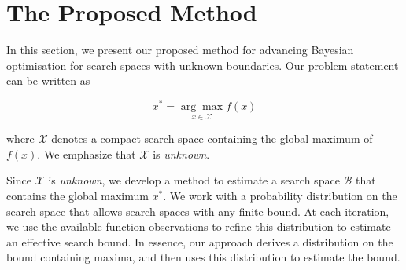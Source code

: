 \documentclass[preprint]{elsarticle}
\begin{document}
%

\section{The Proposed Method}\label{sec:Method}
In this section, we present our proposed method for advancing Bayesian optimisation for search spaces with unknown boundaries. Our problem statement can be written as 
\begin{linenomath*}
\begin{equation}
x^* = \underset{{x \in \mathcal{X}}}{\arg\max} f(x)
\end{equation}
\end{linenomath*}
where $\mathcal{X}$ denotes  a compact search space containing the global maximum of $f(x)$. We emphasize that $\mathcal{X}$ is \emph{unknown}.

Since $\mathcal{X}$ is \emph{unknown}, we develop a method to estimate a search space $\mathcal{B}$ that contains the global maximum $x^*$. We work with a probability distribution on the search space that allows search spaces with any finite bound. At each iteration, we use the available function observations to refine this distribution to estimate an effective search bound. In essence, our approach derives a distribution on the bound containing maxima, and then uses this distribution to estimate the bound.
\end{document}
